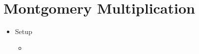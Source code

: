 \section{Montgomery Multiplication}
\begin{itemize}
\item Setup
    \begin{itemize}
    \item 
    \end{itemize}
\end{itemize}